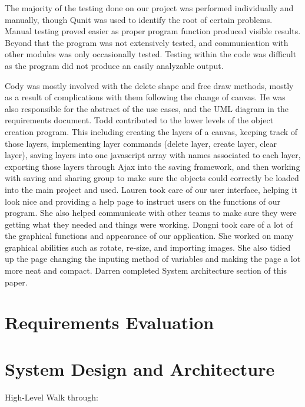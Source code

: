 \documentclass[a4paper, 11pt]{article} %
\begin{document}
        	The majority of the testing done on our project was performed individually and manually, though Qunit was used to identify the root of certain problems. Manual testing proved easier as proper program function produced visible results. Beyond that the program was not extensively tested, and communication with other modules was only occasionally tested. Testing within the code was difficult as the program did not produce an easily analyzable output.
        	
        	Cody was mostly involved with the delete shape and free draw methods, mostly as a result of complications with them following the change of canvas. He was also responsible for the abstract of the use cases, and the UML diagram in the requirements document. Todd contributed to the lower levels of the object creation program. This including creating the layers of a canvas, keeping track of those layers, implementing layer commands (delete layer, create layer, clear layer), saving layers into one javascript array with names associated to each layer, exporting those layers through Ajax into the saving framework, and then working with saving and sharing group to make sure the objects could correctly be loaded into the main project and used. Lauren took care of our user interface, helping it look nice and providing a help page to instruct users on the functions of our program. She also helped communicate with other teams to make sure they were getting what they needed and things were working. Dongni took care of a lot of the graphical functions and appearance of our application. She worked on many graphical abilities such as rotate, re-size, and importing images. She also tidied up the page changing the inputing method of variables and making the page a lot more neat and compact. Darren completed System architecture section of this paper.



\section*{Requirements Evaluation}



\section*{System Design and Architecture}
High-Level Walk through:\\
\end{document}

